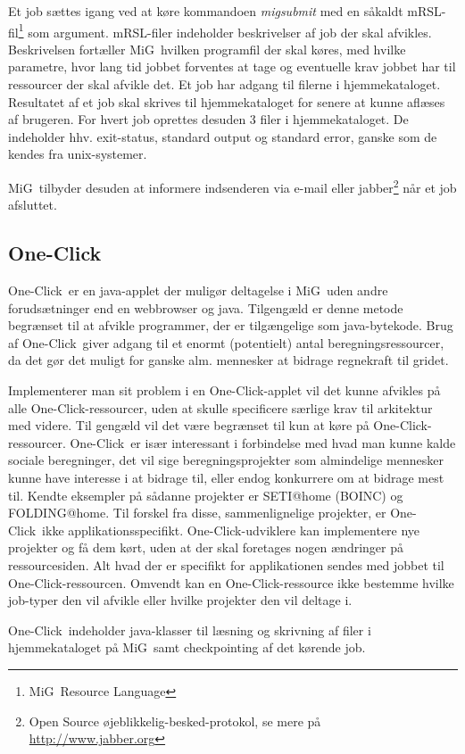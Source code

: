 \documentclass[draft,a4paper,11pt]{article}
\newcommand{\mig}{MiG}
\newcommand{\oc}{One-Click}
\begin{document}
Et job sættes igang ved at køre kommandoen \emph{migsubmit} med en såkaldt mRSL-fil\footnote{\mig\ Resource Language} som argument. mRSL-filer indeholder beskrivelser af job der skal afvikles. Beskrivelsen fortæller \mig\ hvilken programfil der skal køres, med hvilke parametre, hvor lang tid jobbet forventes at tage og eventuelle krav jobbet har til ressourcer der skal afvikle det. Et job har adgang til filerne i  hjemmekataloget. Resultatet af et job skal skrives til hjemmekataloget for senere at kunne aflæses af brugeren. For hvert job oprettes desuden 3 filer i hjemmekataloget. De indeholder hhv. exit-status, standard output og standard error, ganske som de kendes fra unix-systemer.

\mig\ tilbyder desuden at informere indsenderen via e-mail eller jabber\footnote{Open Source øjeblikkelig-besked-protokol, se mere på \url{http://www.jabber.org}} når et job afsluttet. 

\subsection{\oc}\label{oneclick}
\oc\ er en java-applet der muligør deltagelse i \mig\ uden andre forudsætninger end en webbrowser og java. Tilgengæld er denne metode begrænset til at afvikle programmer, der er tilgængelige som java-bytekode. Brug af \oc\ giver adgang til et enormt (potentielt) antal beregningsressourcer, da det gør det muligt for ganske alm. mennesker at bidrage regnekraft til gridet.

Implementerer man sit problem i en \oc-applet vil det kunne afvikles på alle \oc-ressourcer, uden at skulle specificere særlige krav til arkitektur med videre. Til gengæld vil det være begrænset til kun at køre på \oc-ressourcer.
\oc\ er især interessant i forbindelse med hvad man kunne kalde sociale beregninger, det vil sige beregningsprojekter som almindelige mennesker kunne have interesse i at bidrage til, eller endog konkurrere om at bidrage mest til. Kendte eksempler på sådanne projekter er SETI@home (BOINC) og FOLDING@home. Til forskel fra disse, sammenlignelige projekter, er \oc\ ikke applikationsspecifikt. \oc-udviklere kan implementere nye projekter og få dem kørt, uden at der skal foretages nogen ændringer på ressourcesiden. Alt hvad der er specifikt for applikationen sendes med jobbet til \oc-ressourcen. Omvendt kan en \oc-ressource ikke bestemme hvilke job-typer den vil afvikle eller hvilke projekter den vil deltage i.

\oc\ indeholder java-klasser til læsning og skrivning af filer i hjemmekataloget på \mig\, samt checkpointing af det kørende job. 
\end{document}

